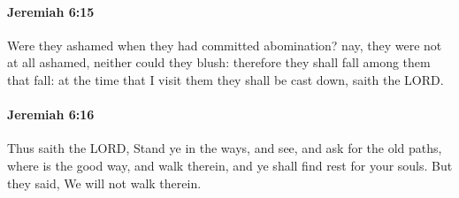 		\paragraph{Jeremiah 6:15} %
			\label{JEREMIAH-6-15}

			Were they ashamed when they had committed abomination? nay, they were not at all ashamed, neither could they blush: therefore they shall fall among them that fall: at the time that I visit them they shall be cast down, saith the LORD.


		\paragraph{Jeremiah 6:16} %
			\label{JEREMIAH-6-16}

			Thus saith the LORD, Stand ye in the ways, and see, and ask for the old paths, where is the good way, and walk therein, and ye shall find rest for your souls. But they said, We will not walk therein.

